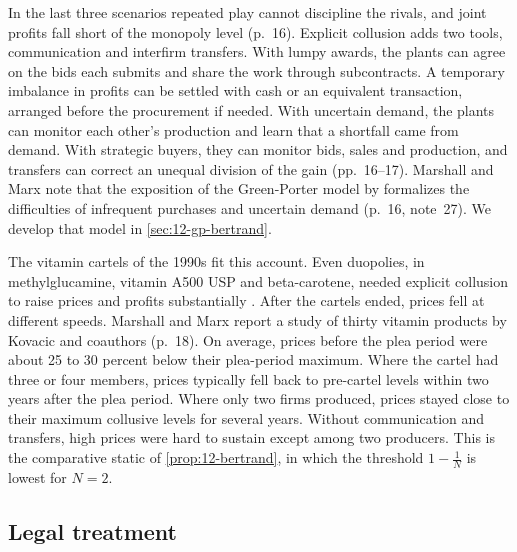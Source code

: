 In the last three scenarios repeated play cannot discipline the rivals, and joint profits fall short of the
monopoly level (p.~16). Explicit collusion adds two tools, communication and interfirm transfers. With lumpy
awards, the plants can agree on the bids each submits and share the work through subcontracts. A temporary
imbalance in profits can be settled with cash or an equivalent transaction, arranged before the procurement if
needed. With uncertain demand, the plants can monitor each other's production and learn that a shortfall came from
demand. With strategic buyers, they can monitor bids, sales and production, and transfers can correct an unequal
division of the gain (pp.~16--17). Marshall and Marx note that the exposition of the Green-Porter model by
\citet{Tirole1988} formalizes the difficulties of infrequent purchases and uncertain demand (p.~16, note~27). We
develop that model in \cref{sec:12-gp-bertrand}.

The vitamin cartels of the 1990s fit this account. Even duopolies, in methylglucamine, vitamin A500 USP and
beta-carotene, needed explicit collusion to raise prices and profits substantially \citep[p.~3]{MarshallMarx2012}.
After the cartels ended, prices fell at different speeds. Marshall and Marx report a study of thirty vitamin
products by Kovacic and coauthors (p.~18). On average, prices before the plea period were about 25 to 30 percent below
their plea-period maximum. Where the cartel had three or four members, prices typically fell back to pre-cartel
levels within two years after the plea period. Where only two firms produced, prices stayed close to their maximum
collusive levels for several years. Without communication and transfers, high prices were hard to sustain except
among two producers. This is the comparative static of \cref{prop:12-bertrand}, in which the threshold
$1 - \frac{1}{N}$ is lowest for $N = 2$.

\subsection{Legal treatment}\label{sec:12-law}

